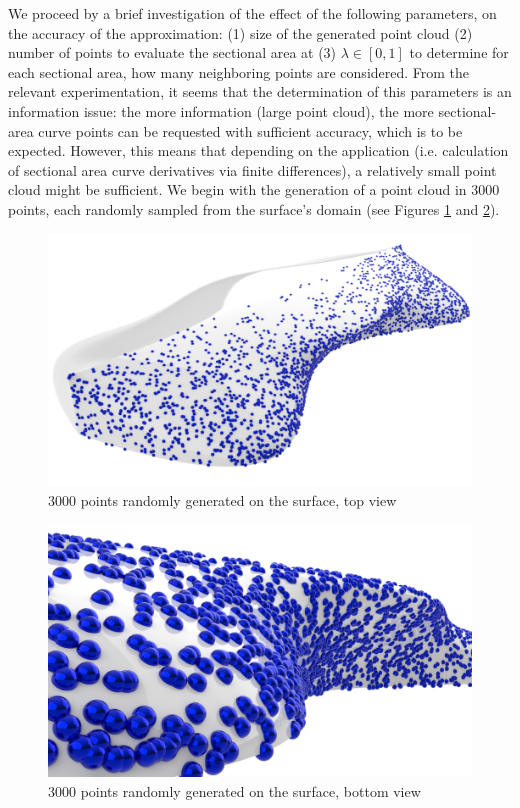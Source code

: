 \documentclass{report}
\begin{document}
\newpar We proceed by a brief investigation of the effect of the following parameters, on the 
accuracy of the approximation: (1) size of the generated point cloud (2) number of points 
to evaluate the sectional area at (3) $\lambda\in[0,1]$ to determine for each sectional area,
how many neighboring points are considered. From the relevant experimentation, it seems that 
the determination of this parameters is an information issue: the more information (large point cloud),
the more sectional-area curve points can be requested with sufficient accuracy, which is to be expected.
However, this means that depending on the application (i.e. calculation of sectional area curve derivatives 
via finite differences), a relatively small point cloud might be sufficient. We begin with the generation of 
a point cloud in 3000 points, each randomly sampled from the surface's domain (see Figures \ref{fig:test-1-wigley-render-3K-point-cloud-1} and \ref{fig:test-1-wigley-render-3K-point-cloud-2}).
\begin{figure}[H]
    \centering
    \includegraphics[width=1.0\linewidth]{figures/test-1-wigley-render-3K-point-cloud-1.png}
    \caption{3000 points randomly generated on the surface, top view}
    \label{fig:test-1-wigley-render-3K-point-cloud-1}
\end{figure}
\begin{figure}[H]
    \centering
    \includegraphics[width=0.7\linewidth]{figures/test-1-wigley-render-3K-point-cloud-2.png}
    \caption{3000 points randomly generated on the surface, bottom view}
    \label{fig:test-1-wigley-render-3K-point-cloud-2}
\end{figure}
\end{document}
